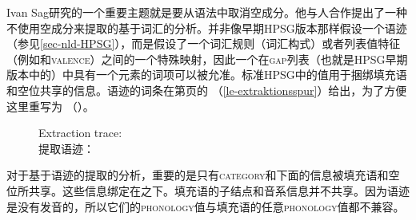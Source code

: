 Ivan Sag研究的一个重要主题就是要从语法中取消空成分。他与人合作提出了一种不使用空成分来提取的基于词汇的分析\citep*{NB94,BMS2001a}。并非像早期HPSG版本那样假设一个语迹（参见\ref{sec-nld-HPSG}），而是假设了一个词汇规则（词汇构式）或者列表值特征（例如\argstc 和\textsc{valence}）之间的一个特殊映射，因此一个在\textsc{gap}列表（也就是HPSG早期版本中的\slaschc）中具有一个元素的词项可以被允准。标准HPSG中的\localfc 值用于捆绑填充语和空位共享的信息。语迹的词条在第\pageref{le-extraktionsspur}页的 （\ref{le-extraktionsspur}）给出，为了方便这里重写为 （）。
\begin{figure}
\eas
\label{le-extraction-trace-two}
Extraction trace: \\
提取语迹：
\zs
\vspace{-2\baselineskip}
\end{figure}%
对于基于语迹的提取的分析，重要的是只有\textsc{category}和\contc 下面的信息被填充语和空位所共享。这些信息绑定在\localc 之下。填充语的子结点和音系信息并不共享。因为语迹是没有发音的，所以它们的\textsc{phonology}值与填充语的任意\textsc{phonology}值都不兼容。

